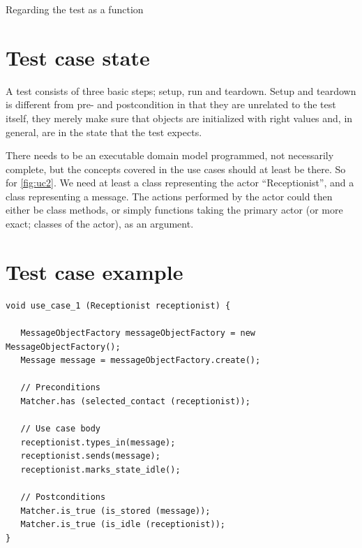Regarding the test as a function


\section{Test case state}
A test consists of three basic steps; setup, run and teardown. Setup and teardown is different from pre- and postcondition in that they are unrelated to the test itself, they merely make sure that objects are initialized with right values and, in general, are in the state that the test expects.

There needs to be an executable domain model programmed, not necessarily complete, but the concepts covered in the use cases should at least be there. So for \ref{fig:uc2}. We need at least a class representing the actor ``Receptionist'', and a class representing a message. The actions performed by the actor could then either be class methods, or simply functions taking the primary actor (or more exact; classes of the actor), as an argument.


\label{sec:test_case_state}


\section{Test case example}
\begin{lstlisting}
void use_case_1 (Receptionist receptionist) {

   MessageObjectFactory messageObjectFactory = new MessageObjectFactory();
   Message message = messageObjectFactory.create();

   // Preconditions
   Matcher.has (selected_contact (receptionist));

   // Use case body 
   receptionist.types_in(message);
   receptionist.sends(message);
   receptionist.marks_state_idle();

   // Postconditions 
   Matcher.is_true (is_stored (message));
   Matcher.is_true (is_idle (receptionist));
}
\end{lstlisting}

